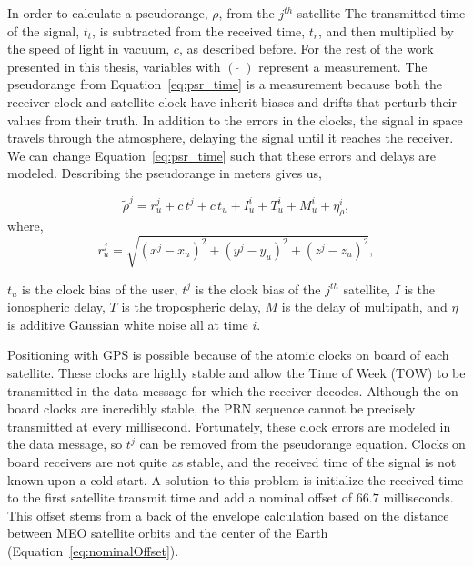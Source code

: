 In order to calculate a pseudorange, \(\rho \), from the \(j^{th}\) satellite The transmitted time of the signal, \(t_t\), is subtracted from the received time, \(t_r\), and then multiplied by the speed of light in vacuum, \(c\), as described before. For the rest of the work presented in this thesis, variables with \({\left(\;\tilde{}\;\right)}\) represent a measurement. The pseudorange from Equation~\ref{eq:psr_time} is a measurement because both the receiver clock and satellite clock have inherit biases and drifts that perturb their values from their truth. In addition to the errors in the clocks, the signal in space travels through the atmosphere, delaying the signal until it reaches the receiver. We can change Equation~\ref{eq:psr_time} such that these errors and delays are modeled. Describing the pseudorange in meters gives us,

\begin{equation}\label{eq:psr_meters}
    \tilde{\rho}^j = r_u^j + c\,t^j + c\,t_u + I^i_u + T^i_u+ M^i_u + \eta^i_{\rho},
\end{equation}
where,
\begin{equation}\label{eq:range_meters}
    r^j_u = \sqrt{{\left(x^j - x_u\right)}^2 + {\left(y^j - y_u\right)}^2 + {\left(z^j - z_u\right)}^2},
\end{equation}

\(t_u\) is the clock bias of the user, \(t^j\) is the clock bias of the \(j^{th}\) satellite, \(I\) is the ionospheric delay, \(T\) is the tropospheric delay, \(M\) is the delay of multipath, and \(\eta \) is additive Gaussian white noise all at time \(i\).

Positioning with GPS is possible because of the atomic clocks on board of each satellite. These clocks are highly stable and allow the Time of Week (TOW) to be transmitted in the data message for which the receiver decodes. Although the on board clocks are incredibly stable, the PRN sequence cannot be precisely transmitted at every millisecond. Fortunately, these clock errors are modeled in the data message, so \(t^j\) can be removed from the pseudorange equation. Clocks on board receivers are not quite as stable, and the received time of the signal is not known upon a cold start. A solution to this problem is initialize the received time to the first satellite transmit time and add a nominal offset of \(66.7\) milliseconds. This offset stems from a back of the envelope calculation based on the distance between MEO satellite orbits and the center of the Earth (Equation~\ref{eq:nominalOffset}).

